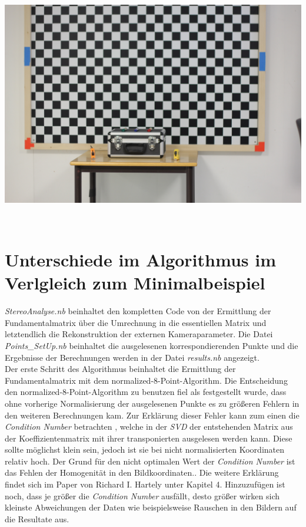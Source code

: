 \begin{minipage}{\linewidth}
	\centering
	\includegraphics[width=.7\linewidth]{images/IMG_5434.jpg}
\end{minipage}\\

\section{Unterschiede im Algorithmus im Verlgleich zum Minimalbeispiel}

\textit{StereoAnalyse.nb} beinhaltet den kompletten Code von der Ermittlung der Fundamentalmatrix über die Umrechnung in die essentiellen Matrix und letztendlich die Rekonstruktion der externen Kameraparameter. Die Datei \textit{Points\_SetUp.nb} beinhaltet die ausgelesenen korrespondierenden Punkte und die Ergebnisse der Berechnungen werden in der Datei \textit{results.nb} angezeigt. \\

Der erste Schritt des Algorithmus beinhaltet die Ermittlung der Fundamentalmatrix mit dem normalized-8-Point-Algorithm. Die Entscheidung den normalized-8-Point-Algorithm  zu benutzen fiel als festgestellt wurde, dass ohne vorherige Normalisierung der ausgelesenen Punkte es zu größeren Fehlern in den weiteren Berechnungen kam. Zur Erklärung dieser Fehler kann zum einen die \textit{Condition Number} betrachten \cite{HZ8}, welche in der \textit{SVD} der entstehenden Matrix aus der Koeffizientenmatrix mit ihrer transponierten ausgelesen werden kann. Diese sollte möglichst klein sein, jedoch ist sie bei nicht normalisierten Koordinaten relativ hoch. Der Grund für den nicht optimalen Wert der \textit{Condition Number} ist das Fehlen der Homogenität in den Bildkoordinaten.\cite{HZ8}. Die weitere Erklärung findet sich im Paper von Richard I. Hartely unter Kapitel 4. Hinzuzufügen ist noch, dass je größer die \textit{Condition Number} ausfällt, desto größer wirken sich kleinste Abweichungen der Daten wie beispielsweise Rauschen in den Bildern auf die Resultate aus. \\







